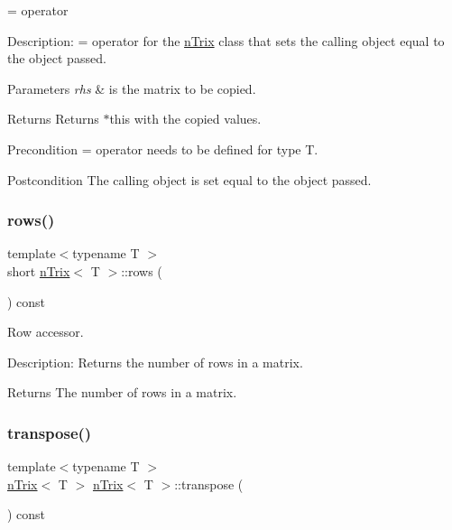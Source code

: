 = operator 

Description\+: = operator for the \hyperlink{classnTrix}{n\+Trix} class that sets the calling object equal to the object passed. 
\begin{DoxyParams}{Parameters}
{\em rhs} & is the matrix to be copied. \\
\hline
\end{DoxyParams}
\begin{DoxyReturn}{Returns}
Returns $\ast$this with the copied values. 
\end{DoxyReturn}
\begin{DoxyPrecond}{Precondition}
= operator needs to be defined for type T. 
\end{DoxyPrecond}
\begin{DoxyPostcond}{Postcondition}
The calling object is set equal to the object passed. 
\end{DoxyPostcond}
\mbox{\label{classnTrix_a1b837cfb3182d38894e86a252cbc5ce1}} 
\subsubsection{\texorpdfstring{rows()}{rows()}}
{\footnotesize\ttfamily template$<$typename T $>$ \\
short \hyperlink{classnTrix}{n\+Trix}$<$ T $>$\+::rows (\begin{DoxyParamCaption}{ }\end{DoxyParamCaption}) const}



Row accessor. 

Description\+: Returns the number of rows in a matrix. \begin{DoxyReturn}{Returns}
The number of rows in a matrix. 
\end{DoxyReturn}
\mbox{\label{classnTrix_ab0ac2336544d0957fd8b4ee2d99179b9}} 
\subsubsection{\texorpdfstring{transpose()}{transpose()}}
{\footnotesize\ttfamily template$<$typename T $>$ \\
\hyperlink{classnTrix}{n\+Trix}$<$ T $>$ \hyperlink{classnTrix}{n\+Trix}$<$ T $>$\+::transpose (\begin{DoxyParamCaption}{ }\end{DoxyParamCaption}) const}



